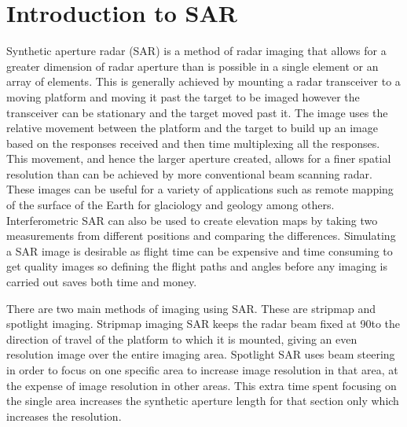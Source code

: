 \section{Introduction to SAR}

Synthetic aperture radar (SAR) is a method of radar imaging that allows for a greater dimension of radar aperture than is possible in a single element or an array of elements. This is generally achieved by mounting a radar transceiver to a moving platform and moving it past the target to be imaged however the transceiver can be stationary and the target moved past it. The image uses the relative movement between the platform and the target to build up an image based on the responses received and then time multiplexing all the responses. This movement, and hence the larger aperture created, allows for a finer spatial resolution than can be achieved by more conventional beam scanning radar. These images can be useful for a variety of applications such as remote mapping of the surface of the Earth for glaciology and geology among others. Interferometric SAR can also be used to create elevation maps by taking two measurements from different positions and comparing the differences.
Simulating a SAR image is desirable as flight time can be expensive and time consuming to get quality images so defining the flight paths and angles before any imaging is carried out saves both time and money. \par
There are two main methods of imaging using SAR. These are stripmap and spotlight imaging. Stripmap imaging SAR keeps the radar beam fixed at 90\degree to the direction of travel of the platform to which it is mounted, giving an even resolution image over the entire imaging area. Spotlight SAR uses beam steering in order to focus on one specific area to increase image resolution in that area, at the expense of image resolution in other areas. This extra time spent focusing on the single area increases the synthetic aperture length for that section only which increases the resolution.

